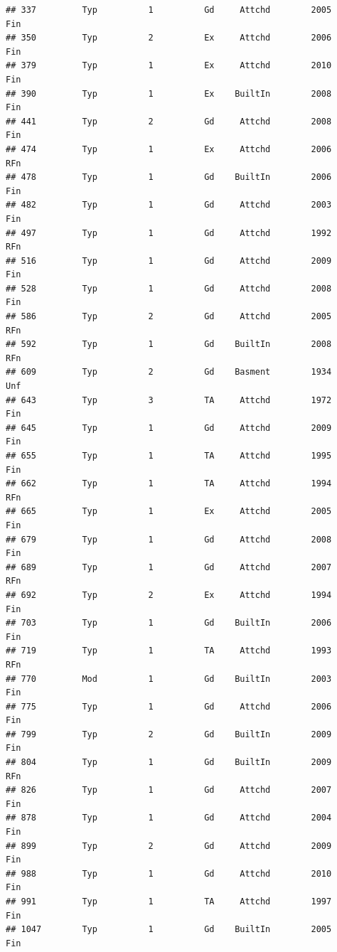 \documentclass[]{article}
\begin{document}
\begin{verbatim}
## 337         Typ          1          Gd     Attchd        2005          Fin
## 350         Typ          2          Ex     Attchd        2006          Fin
## 379         Typ          1          Ex     Attchd        2010          Fin
## 390         Typ          1          Ex    BuiltIn        2008          Fin
## 441         Typ          2          Gd     Attchd        2008          Fin
## 474         Typ          1          Ex     Attchd        2006          RFn
## 478         Typ          1          Gd    BuiltIn        2006          Fin
## 482         Typ          1          Gd     Attchd        2003          Fin
## 497         Typ          1          Gd     Attchd        1992          RFn
## 516         Typ          1          Gd     Attchd        2009          Fin
## 528         Typ          1          Gd     Attchd        2008          Fin
## 586         Typ          2          Gd     Attchd        2005          RFn
## 592         Typ          1          Gd    BuiltIn        2008          RFn
## 609         Typ          2          Gd    Basment        1934          Unf
## 643         Typ          3          TA     Attchd        1972          Fin
## 645         Typ          1          Gd     Attchd        2009          Fin
## 655         Typ          1          TA     Attchd        1995          Fin
## 662         Typ          1          TA     Attchd        1994          RFn
## 665         Typ          1          Ex     Attchd        2005          Fin
## 679         Typ          1          Gd     Attchd        2008          Fin
## 689         Typ          1          Gd     Attchd        2007          RFn
## 692         Typ          2          Ex     Attchd        1994          Fin
## 703         Typ          1          Gd    BuiltIn        2006          Fin
## 719         Typ          1          TA     Attchd        1993          RFn
## 770         Mod          1          Gd    BuiltIn        2003          Fin
## 775         Typ          1          Gd     Attchd        2006          Fin
## 799         Typ          2          Gd    BuiltIn        2009          Fin
## 804         Typ          1          Gd    BuiltIn        2009          RFn
## 826         Typ          1          Gd     Attchd        2007          Fin
## 878         Typ          1          Gd     Attchd        2004          Fin
## 899         Typ          2          Gd     Attchd        2009          Fin
## 988         Typ          1          Gd     Attchd        2010          Fin
## 991         Typ          1          TA     Attchd        1997          Fin
## 1047        Typ          1          Gd    BuiltIn        2005          Fin

\end{verbatim}
\end{document}

